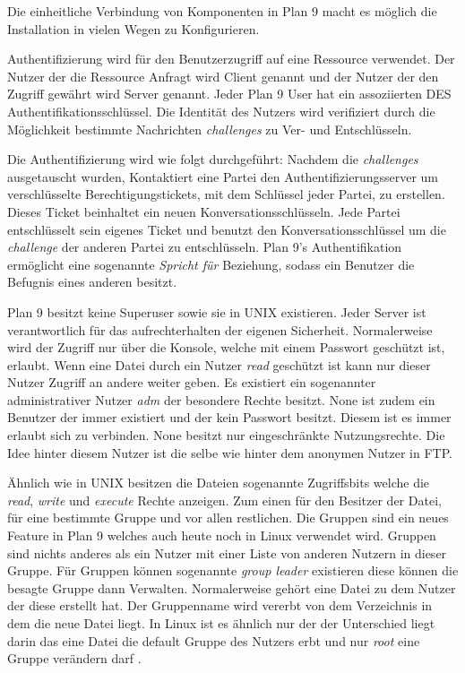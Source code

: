 \documentclass[11pt,technote]{IEEEtran}
\begin{document}
        Die einheitliche Verbindung von Komponenten in Plan 9 macht es m\"oglich die Installation in vielen Wegen zu Konfigurieren.
        
        Authentifizierung wird f\"ur den Benutzerzugriff auf eine Ressource verwendet. Der Nutzer der die Ressource Anfragt wird Client genannt und der
        Nutzer der den Zugriff gew\"ahrt wird Server genannt. Jeder Plan 9 User hat ein assoziierten DES Authentifikationsschl\"ussel. Die Identit\"at
        des Nutzers wird verifiziert durch die M\"oglichkeit bestimmte Nachrichten \textit{challenges} zu Ver- und Entschl\"usseln.
        
        Die Authentifizierung wird wie folgt durchgef\"uhrt: Nachdem die \textit{challenges} ausgetauscht wurden, 
        Kontaktiert eine Partei den Authentifizierungsserver um verschl\"usselte Berechtigungstickets, 
        mit dem Schl\"ussel jeder Partei, zu erstellen. Dieses Ticket beinhaltet ein neuen Konversationsschl\"usseln.
        Jede Partei entschl\"usselt sein eigenes Ticket und benutzt den Konversationsschl\"ussel um die \textit{challenge} der anderen Partei zu entschl\"usseln.     
        Plan 9's Authentifikation erm\"oglicht eine sogenannte \textit{Spricht f\"ur} Beziehung, sodass ein Benutzer die Befugnis eines anderen besitzt.
        
        Plan 9 besitzt keine Superuser sowie sie in UNIX existieren. Jeder Server ist verantwortlich f\"ur das aufrechterhalten der eigenen Sicherheit.
        Normalerweise wird der Zugriff nur \"uber die Konsole, welche mit einem Passwort gesch\"utzt ist, erlaubt.
        Wenn eine Datei durch ein Nutzer \textit{read} gesch\"utzt ist kann nur dieser Nutzer Zugriff an andere weiter geben.
        Es existiert ein sogenannter administrativer Nutzer \textit{adm} der besondere Rechte besitzt. 
        None ist zudem ein Benutzer der immer existiert und der kein Passwort besitzt.
        Diesem ist es immer erlaubt sich zu verbinden. None besitzt nur eingeschr\"ankte Nutzungsrechte. Die Idee hinter diesem Nutzer ist die selbe
        wie hinter dem anonymen Nutzer in FTP.
       
        \"Ahnlich wie in UNIX besitzen die Dateien sogenannte Zugriffsbits welche die \textit{read}, \textit{write} und \textit{execute} Rechte anzeigen. 
         Zum einen f\"ur den Besitzer der Datei, f\"ur eine bestimmte Gruppe und vor allen restlichen.
         Die Gruppen sind ein neues Feature in Plan 9 welches auch heute noch in Linux verwendet wird. Gruppen sind nichts anderes
         als ein Nutzer mit einer Liste von anderen Nutzern in dieser Gruppe. F\"ur Gruppen k\"onnen sogenannte \textit{group leader} existieren diese k\"onnen die
         besagte Gruppe dann Verwalten. Normalerweise geh\"ort eine Datei zu dem Nutzer der diese erstellt hat. 
         Der Gruppenname wird vererbt von dem Verzeichnis in dem die neue Datei liegt. In Linux ist es \"ahnlich nur der der Unterschied liegt darin
         das eine Datei die default Gruppe des Nutzers erbt und nur \textit{root} eine Gruppe ver\"andern darf \cite{Url:linux:groups} \cite{Url:linux:groupmod}.
\end{document}
